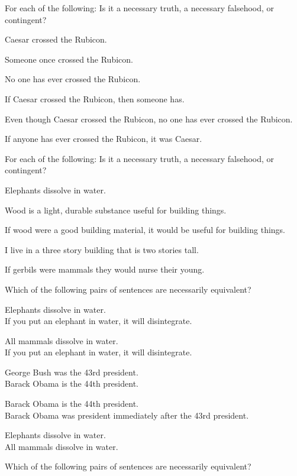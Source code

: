 \practiceproblems
\problempart
\label{pr.EnglishTautology2}
For each of the following: Is it a necessary truth, a necessary falsehood, or contingent?
\begin{earg}
\item Caesar crossed the Rubicon.
\item Someone once crossed the Rubicon.
\item No one has ever crossed the Rubicon.
\item If Caesar crossed the Rubicon, then someone has.
\item Even though Caesar crossed the Rubicon, no one has ever crossed the Rubicon.
\item If anyone has ever crossed the Rubicon, it was Caesar.
\end{earg}

\problempart
For each of the following: Is it a necessary truth, a necessary falsehood, or contingent?
\begin{earg}
\item Elephants dissolve in water.
\item Wood is a light, durable substance useful for building things.
\item If wood were a good building material, it would be useful for building things.
\item I live in a three story building that is two stories tall.
\item If gerbils were mammals they would nurse their young.
\end{earg}

\problempart Which of the following pairs of sentences are necessarily  equivalent? 

\begin{earg}
\item Elephants dissolve in water.	\\
	If you put an elephant in water, it will disintegrate.
\item All mammals dissolve in water.\\		
	If you put an elephant in water, it will disintegrate. 
\item George Bush was the 43rd president. \\
	 Barack Obama is the 44th president. 
\item Barack Obama is the 44th president. \\
	  Barack Obama was president immediately after the 43rd president. 
\item Elephants dissolve in water. 	\\	
	All mammals dissolve in water. 
\end{earg}
\problempart Which of the following pairs of sentences are necessarily equivalent? 

